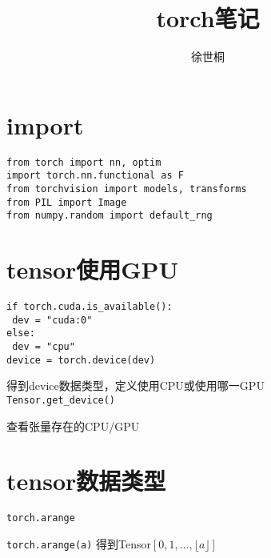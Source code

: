 \documentclass[UTF8]{ctexart}
\title{torch笔记}
\author{徐世桐}
\date{}
\begin{document}
\maketitle

\section{import}
\noindent \texttt{from torch import nn, optim}\\
\texttt{import torch.nn.functional as F}\\
\texttt{from torchvision import models, transforms}\\
\texttt{from PIL import Image}\\
\texttt{from numpy.random import default\_rng}

\section{tensor使用GPU}
\noindent \texttt{}
\texttt{if torch.cuda.is\_available():}\\
\texttt{  dev = "cuda:0"}\\
\texttt{else:}\\
\texttt{  dev = "cpu"}\\
\texttt{device = torch.device(dev)}

  得到device数据类型，定义使用CPU或使用哪一GPU\\
\texttt{Tensor.get\_device()}

  查看张量存在的CPU/GPU



\section{tensor数据类型}
\noindent \texttt{torch.arange}

  \texttt{torch.arange(a)} 得到Tensor$[0, 1, ..., \lfloor a \rfloor]$
\end{document}
